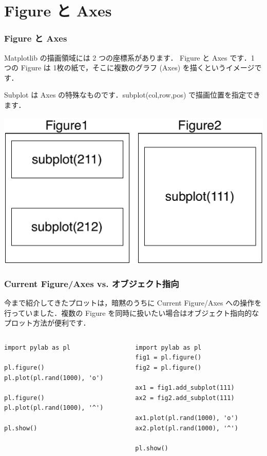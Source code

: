 \section{Figure と Axes}
\begin{frame}[t,fragile]
\frametitle{Figure と Axes}
Matplotlib の描画領域には 2 つの座標系があります．
Figure と Axes です．1 つの Figure は 1枚の紙で，そこに複数のグラフ (Axes) を描くというイメージです．

Subplot は Axes の特殊なものです．subplot(col,row,pos) で描画位置を指定できます．

\begin{center}
\includegraphics[scale=0.4]{fig_ax.pdf}
\end{center}
\end{frame}

\begin{frame}[t,fragile]
\frametitle{Current Figure/Axes vs. オブジェクト指向}
今まで紹介してきたプロットは，暗黙のうちに Current Figure/Axes への操作を行っていました．複数の Figure を同時に扱いたい場合はオブジェクト指向的なプロット方法が便利です．

\begin{columns}
\begin{column}{.52\textwidth}
\begin{lstlisting}
import pylab as pl

pl.figure() 
pl.plot(pl.rand(1000), 'o')

pl.figure()
pl.plot(pl.rand(1000), '^')

pl.show()
\end{lstlisting}
\end{column}

\begin{column}{.52\textwidth}
\begin{lstlisting}
import pylab as pl
fig1 = pl.figure() 
fig2 = pl.figure()

ax1 = fig1.add_subplot(111)  
ax2 = fig2.add_subplot(111)  

ax1.plot(pl.rand(1000), 'o')
ax2.plot(pl.rand(1000), '^')

pl.show()
\end{lstlisting}
\end{column}
\end{columns}
\end{frame}

